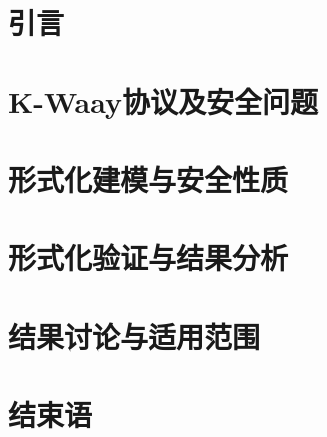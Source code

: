 

\setcounter{section}{-1}

\section{引言}
\label{sec:introduction}


\section{K-Waay协议及安全问题}
\label{sec:identity-problem}


\section{形式化建模与安全性质}
\label{sec:formal-modeling}


\section{形式化验证与结果分析}
\label{sec:formal-analysis}


\section{结果讨论与适用范围}
\label{sec:discussion}


\section{结束语}
\label{sec:conclusion}


{\small


}

